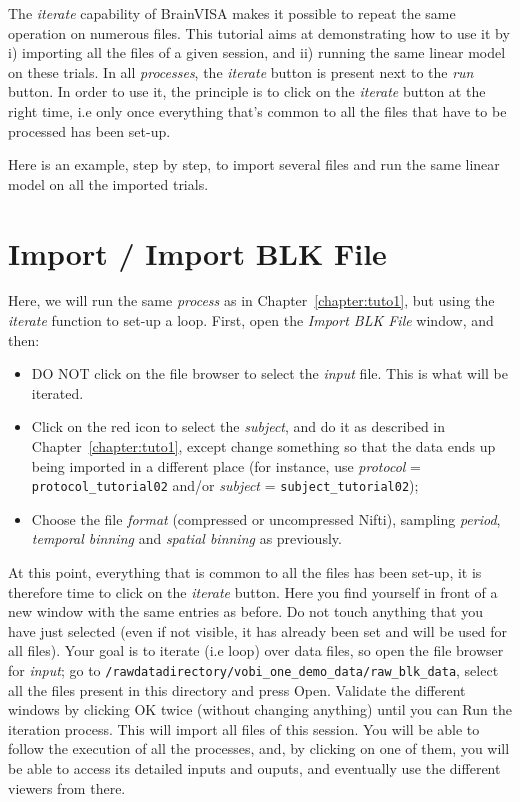 The {\em iterate} capability of BrainVISA makes it possible to repeat the same operation on numerous files.
This tutorial aims at demonstrating how to use it by i) importing all the files of a given session, and ii) running the same linear model on these trials.
In all {\em processes}, the \textit{iterate} button is present next to the \textit{run} button. In order to use it, the principle is to click on the \textit{iterate} button at the right time, i.e only once everything that's common to all the files that have to be processed has been set-up.

Here is an example, step by step, to import several files and run the same linear model on all the imported trials.



\section{Import / Import BLK File}

Here, we will run the same \textit{process} as in Chapter~\ref{chapter:tuto1}, but using the \textit{iterate} function to set-up a loop. First, open the \textit{Import BLK File} window, and then:

\begin{itemize}
  \item DO NOT click on the file browser to select the \textit{input} file. This is what will be iterated.
  \item Click on the red icon to select the \textit{subject}, and do it as described in Chapter~\ref{chapter:tuto1}, except change something so that the data ends up being imported in a different place (for instance, use \textit{protocol} = \texttt{protocol\_tutorial02} and/or \textit{subject} = \texttt{subject\_tutorial02});
  \item Choose the file \textit{format} (compressed or uncompressed Nifti), sampling \textit{period}, \textit{temporal binning} and \textit{spatial binning} as previously.
\end{itemize}

At this point, everything that is common to all the files has been set-up, it is therefore time to click on the \textit{iterate} button.
Here you find yourself in front of a new window with the same entries as before.
Do not touch anything that you have just selected (even if not visible, it has already been set and will be used for all files).
Your goal is to iterate (i.e loop) over data files, so open the file browser for \textit{input}; go to \texttt{/rawdatadirectory/vobi\_one\_demo\_data/raw\_blk\_data}, select all the files present in this directory and press Open.
Validate the different windows by clicking OK twice (without changing anything) until you can Run the iteration process. This will import all files of this session. You will be able to follow the execution of all the processes, and, by clicking on one of them, you will be able to access its detailed inputs and ouputs, and eventually use the different viewers from there.



